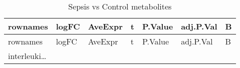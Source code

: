 \documentclass[
]{article}
\begin{document}
\begin{longtable}[]{@{}lllllll@{}}
\caption{\label{tab:Sepsis-vs-Control-metabolites}Sepsis vs Control metabolites}\tabularnewline
\toprule
\begin{minipage}[b]{0.12\columnwidth}\raggedright
rownames\strut
\end{minipage} & \begin{minipage}[b]{0.12\columnwidth}\raggedright
logFC\strut
\end{minipage} & \begin{minipage}[b]{0.12\columnwidth}\raggedright
AveExpr\strut
\end{minipage} & \begin{minipage}[b]{0.12\columnwidth}\raggedright
t\strut
\end{minipage} & \begin{minipage}[b]{0.12\columnwidth}\raggedright
P.Value\strut
\end{minipage} & \begin{minipage}[b]{0.12\columnwidth}\raggedright
adj.P.Val\strut
\end{minipage} & \begin{minipage}[b]{0.12\columnwidth}\raggedright
B\strut
\end{minipage}\tabularnewline
\midrule
\endfirsthead
\toprule
\begin{minipage}[b]{0.12\columnwidth}\raggedright
rownames\strut
\end{minipage} & \begin{minipage}[b]{0.12\columnwidth}\raggedright
logFC\strut
\end{minipage} & \begin{minipage}[b]{0.12\columnwidth}\raggedright
AveExpr\strut
\end{minipage} & \begin{minipage}[b]{0.12\columnwidth}\raggedright
t\strut
\end{minipage} & \begin{minipage}[b]{0.12\columnwidth}\raggedright
P.Value\strut
\end{minipage} & \begin{minipage}[b]{0.12\columnwidth}\raggedright
adj.P.Val\strut
\end{minipage} & \begin{minipage}[b]{0.12\columnwidth}\raggedright
B\strut
\end{minipage}\tabularnewline
\midrule
\endhead
\begin{minipage}[t]{0.12\columnwidth}\raggedright
interleuki\ldots{}\strut

\end{minipage}
\end{longtable}
\end{document}
